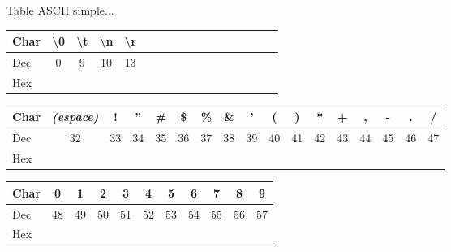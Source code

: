 \documentclass[11pt,a4paper]{article}
\begin{document}
\fancyhf{} %
\renewcommand{\headrulewidth}{0pt}
\renewcommand{\footrulewidth}{0pt}


\begin{center}
\begin{LARGE}
Table ASCII \og simple... \fg{}
\end{LARGE}
\end{center}


\vfillFirst

\begin{center}

\begin{tabular}{ | l |c|c|c|c|c| c |c|c|c|c|c|c|c|c|c|c| }
\hline
Char & \textbackslash{}0 & \textbackslash{}t & \textbackslash{}n & \textbackslash{}r \\
\hline
Dec &          0         &        9          &         10        &        13         \\
\hline
Hex &                    &                   &                   &                   \\
\hline
\end{tabular}

\vspace*{1cm}

\begin{tabular}{ | l |c|c|c|c|c|c|c|c|c|c|c|c|c|c|c|c| }
\hline
Char & \textit{(espace)} &  ! & '' & \# & \$ & \% & \& &  ' &  ( &  ) &  * &  + &  , &  - &  . &  / \\
\hline
Dec &        32          & 33 & 34 & 35 & 36 & 37 & 38 & 39 & 40 & 41 & 42 & 43 & 44 & 45 & 46 & 47 \\
\hline
Hex &                    &    &    &    &    &    &    &    &    &    &    &    &    &    &    &    \\
\hline
\end{tabular}

\vspace*{1cm}

\begin{tabular}{ | l |c|c|c|c|c|c|c|c|c|c| }
\hline
Char & 0 &  1 &  2 &  3 &  4 &  5 &  6 &  7 &  8 &  9 \\
\hline
Dec & 48 & 49 & 50 & 51 & 52 & 53 & 54 & 55 & 56 & 57 \\
\hline
Hex &    &    &    &    &    &    &    &    &    & \\
\hline
\end{tabular}

\vspace*{1cm}


\end{center}
\end{document}
